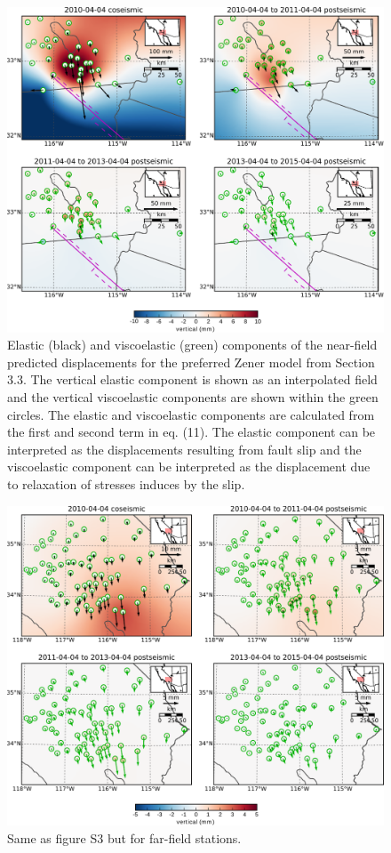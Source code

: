 \documentclass[draft,jgrga]{agutex}
\begin{document}
\begin{figure}
\noindent\includegraphics[scale=0.9]{Figures/2016jb013114-pS03}
\caption{
Elastic (black) and viscoelastic (green) components of the near-field predicted displacements for the preferred Zener model from Section 3.3.  The vertical elastic component is shown as an interpolated field and the vertical viscoelastic components are shown within the green circles.  The elastic and viscoelastic components are calculated from the first and second term in eq. (11).  The elastic component can be interpreted as the displacements resulting from fault slip and the viscoelastic component can be interpreted as the displacement due to relaxation of stresses induces by the slip. 
}
\label{fig:S3}
\end{figure}

\begin{figure}
\noindent\includegraphics[scale=0.9]{Figures/2016jb013114-pS04}
\caption{
Same as figure S3 but for far-field stations.
}
\label{fig:S4}
\end{figure}
\end{document}
